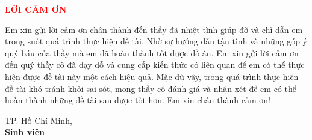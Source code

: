 \pagestyle{empty}
\begin{center}
	{\Large\textbf{\textcolor{red}{LỜI CẢM ƠN}}}
\end{center}

\vspace{1cm}

\hspace*{2em} Em xin gửi lời cảm ơn chân thành đến thầy \TenGVHD{} đã nhiệt tình giúp đỡ và chỉ dẫn em trong suốt quá trình thực hiện đề tài. Nhờ sự hướng dẫn tận tình và những góp ý quý báu của thầy mà em đã hoàn thành tốt được đồ án. Em xin gửi lời cảm ơn đến quý thầy cô đã dạy dỗ và cung cấp kiến thức có liên quan để em có thể thực hiện được đề tài này một cách hiệu quả. Mặc dù vậy, trong quá trình thực hiện đề tài khó tránh khỏi sai sót, mong thầy cô đánh giá và nhận xét để em có thể hoàn thành những đề tài sau được tốt hơn. Em xin chân thành cảm ơn!

\vspace{6cm}

\hfill
\begin{minipage}{0.5\textwidth}
	\begin{center}
		TP. Hồ Chí Minh, \NgayBaoCao\\[0.3cm]
		\textbf{Sinh viên}\\[1.2cm]
		\vspace{3cm}
		\TenSVTH
	\end{center}
\end{minipage}
